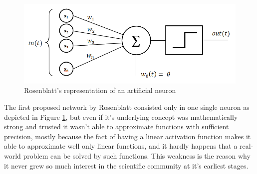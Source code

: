 \documentclass[11pt,a4paper,titlepage]{book}
\begin{document}
\begin{figure}[h]
\includegraphics[scale=0.3]{imgs/ch_1/digital_neuron.png}
    \centering
    \caption{Rosenblatt's representation of an artificial neuron}
    \label{digital_neuron}
\end{figure}
The first proposed network by Rosenblatt consisted only in one single neuron as depicted in Figure \ref{digital_neuron}, but even if it's underlying concept was mathematically strong and trusted it wasn't able to approximate functions with sufficient precision, mostly because the fact of having a linear activation function makes it able to approximate well only linear functions, and it hardly happens that a real-world problem can be solved by such functions. This weakness is the reason why it never grew so much interest in the scientific community at it's earliest stages.
\end{document}
